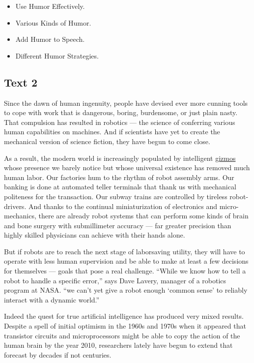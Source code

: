 \documentclass[UTF8,11pt]{ctexart}
\begin{document}
\begin{itemize}[leftmargin=2em,itemsep=.2em,topsep=.4em]\item[A.] Use Humor Effectively.
\item[B.] Various Kinds of Humor.
\item[C.] Add Humor to Speech.
\item[D.] Different Humor Strategies.
\end{itemize}

\subsection*{\textbf{Text 2}}


Since the dawn of human ingenuity, people have devised ever more cunning tools to cope with work that is dangerous, boring, burdensome, or just plain nasty. That compulsion has resulted in robotics — the science of conferring various human capabilities on machines. And if scientists have yet to create the mechanical version of science fiction, they have begun to come close.


As a result, the modern world is increasingly populated by intelligent \uline{gizmos }whose presence we barely notice but whose universal existence has removed much human labor. Our factories hum to the rhythm of robot assembly arms. Our banking is done at automated teller terminals that thank us with mechanical politeness for the transaction. Our subway trains are controlled by tireless robot-drivers. And thanks to the continual miniaturization of electronics and micro-mechanics, there are already robot systems that can perform some kinds of brain and bone surgery with submillimeter accuracy — far greater precision than highly skilled physicians can achieve with their hands alone.


But if robots are to reach the next stage of laborsaving utility, they will have to operate with less human supervision and be able to make at least a few decisions for themselves — goals that pose a real challenge. “While we know how to tell a robot to handle a specific error,” says Dave Lavery, manager of a robotics program at NASA. “we can’t yet give a robot enough ‘common sense’ to reliably interact with a dynamic world.”


Indeed the quest for true artificial intelligence has produced very mixed results. Despite a spell of initial optimism in the 1960s and 1970s when it appeared that transistor circuits and microprocessors might be able to copy the action of the human brain by the year 2010, researchers lately have begun to extend that forecast by decades if not centuries.
\end{document}
